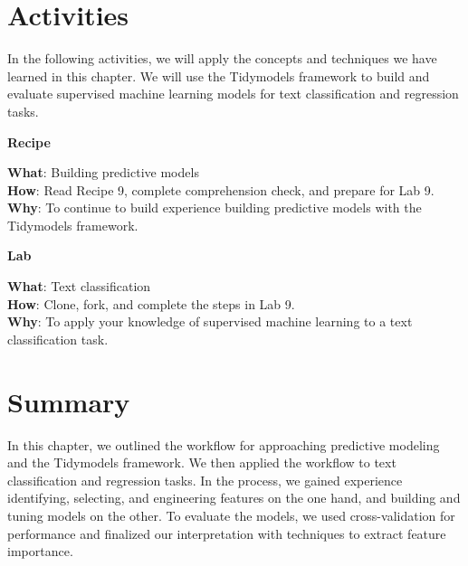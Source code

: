 \documentclass[
  letterpaper,
  krantz1]{latex/krantz-mod}
\theoremstyle{definition}
\theoremstyle{definition}
\theoremstyle{remark}
\begin{document}
\section*{Activities}\label{activities-7}


In the following activities, we will apply the concepts and techniques
we have learned in this chapter. We will use the Tidymodels framework to
build and evaluate supervised machine learning models for text
classification and regression tasks.

\begin{tcolorbox}[enhanced jigsaw, toprule=.15mm, breakable, colback=white, arc=.35mm, left=2mm, colframe=quarto-callout-color-frame, opacityback=0, bottomrule=.15mm, rightrule=.15mm, leftrule=.75mm]

\textbf{ Recipe}

\textbf{What}: Building predictive models\\
\textbf{How}: Read Recipe 9, complete comprehension check, and prepare
for Lab 9.\\
\textbf{Why}: To continue to build experience building predictive models
with the Tidymodels framework.

\end{tcolorbox}

\begin{tcolorbox}[enhanced jigsaw, toprule=.15mm, breakable, colback=white, arc=.35mm, left=2mm, colframe=quarto-callout-color-frame, opacityback=0, bottomrule=.15mm, rightrule=.15mm, leftrule=.75mm]

\textbf{ Lab}

\textbf{What}: Text classification\\
\textbf{How}: Clone, fork, and complete the steps in Lab 9.\\
\textbf{Why}: To apply your knowledge of supervised machine learning to
a text classification task.

\end{tcolorbox}

\section*{Summary}\label{summary-8}


In this chapter, we outlined the workflow for approaching predictive
modeling and the Tidymodels framework. We then applied the workflow to
text classification and regression tasks. In the process, we gained
experience identifying, selecting, and engineering features on the one
hand, and building and tuning models on the other. To evaluate the
models, we used cross-validation for performance and finalized our
interpretation with techniques to extract feature importance.
\end{document}
